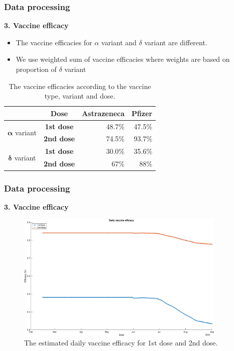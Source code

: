 \documentclass[aspectratio=169, 9pt, xcolor=dvipsnames]{beamer}
\begin{document}
	\begin{frame}\frametitle{Data processing}
	    \textbf{3. Vaccine efficacy}
		\begin{itemize}
			\item The vaccine efficacies for $\alpha$ variant and $\delta$ variant are different.\footnotemark[1]
			\item We use weighted sum of vaccine efficacies where weights are based on proportion of $\delta$ variant
		\end{itemize}
		\begin{table}
			\begin{tabular}{c|crr}
				\toprule
				& \textbf{Dose} & \textbf{Astrazeneca} & \textbf{Pfizer} \\
				\midrule
				\multirow{2}{*}{$\mathbf{\alpha}$ variant} & \textbf{1st dose} & 48.7\% & 47.5\% \\
				& \textbf{2nd dose} & 74.5\% & 93.7\% \\
				\midrule
				\multirow{2}{*}{$\mathbf{\delta}$ variant} & \textbf{1st dose} & 30.0\% & 35.6\% \\
				& \textbf{2nd dose} & 67\% & 88\% \\
				\bottomrule
			\end{tabular}
			\caption{The vaccine efficacies according to the vaccine type, variant and dose.}
		\end{table}
	\end{frame}

	\begin{frame}\frametitle{Data processing}
	    \textbf{3. Vaccine efficacy}
		\begin{figure}
			\centering
			\includegraphics[width=10cm]{../results/data/vaccine_efficacy.eps}
			\caption{The estimated daily vaccine efficacy for 1st dose and 2nd dose.}
		\end{figure}
	\end{frame}
\end{document}
